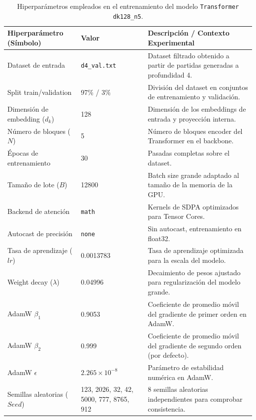 \documentclass[12pt, a4paper]{article}
\begin{document}
\begin{table}[htbp]
    \centering
    \small
    \begin{tabular}{|p{4.5cm}|p{3cm}|p{8.5cm}|}
    \hline
    \textbf{Hiperparámetro (Símbolo)} & \textbf{Valor} & \textbf{Descripción / Contexto Experimental} \\
    \hline
    Dataset de entrada & \texttt{d4\_val.txt} & Dataset filtrado obtenido a partir de partidas generadas a profundidad 4. \\ \hline
    Split train/validation & 97\% / 3\% & División del dataset en conjuntos de entrenamiento y validación. \\ \hline
    Dimensión de embedding ($d_k$) & 128 & Dimensión de los embeddings de entrada y proyección interna. \\ \hline
    Número de bloques ($N$) & 5 & Número de bloques encoder del Transformer en el backbone. \\ \hline
    Épocas de entrenamiento & 30 & Pasadas completas sobre el dataset. \\ \hline
    Tamaño de lote ($B$) & 12800 & Batch size grande adaptado al tamaño de la memoria de la GPU. \\ \hline
    Backend de atención & \texttt{math} & Kernels de SDPA optimizados para Tensor Cores. \\ \hline
    Autocast de precisión & \texttt{none} & Sin autocast, entrenamiento en float32. \\ \hline
    Tasa de aprendizaje ($lr$) & 0.0013783 & Tasa de aprendizaje optimizada para la escala del modelo. \\ \hline
    Weight decay ($\lambda$) & 0.04996 & Decaimiento de pesos ajustado para regularización del modelo grande. \\ \hline
    AdamW $\beta_1$ & 0.9053 & Coeficiente de promedio móvil del gradiente de primer orden en AdamW. \\ \hline
    AdamW $\beta_2$ & 0.999 & Coeficiente de promedio móvil del gradiente de segundo orden (por defecto). \\ \hline
    AdamW $\epsilon$ & $2.265 \times 10^{-8}$ & Parámetro de estabilidad numérica en AdamW. \\ \hline
    Semillas aleatorias ($Seed$) & 123, 2026, 32, 42, 5000, 777, 8765, 912 & 8 semillas aleatorias independientes para comprobar consistencia. \\
    \hline
    \end{tabular}
    \caption[Hiperparámetros del modelo grande]{Hiperparámetros empleados en el entrenamiento del modelo \texttt{Transformer dk128\_n5}.}
    \label{tab:hiperparametros_ablation_dk128}
\end{table}
\end{document}
